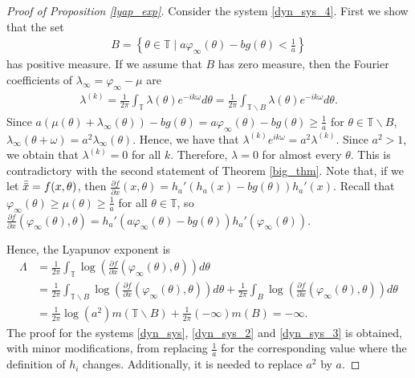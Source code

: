 \documentclass[12pt]{article}
\newcommand{\T}{\mathbb{T}}
\theoremstyle{plain}
\theoremstyle{remark}
\theoremstyle{definition}
\begin{document}
\begin{proof}[Proof of Proposition \ref{lyap_exp}]
    Consider the system \eqref{dyn_sys_4}. First we show that the set
    \begin{align*}
        B = \left\{\theta\in\T\mid a\varphi_\infty(\theta)-b g(\theta)<\frac{1}{a}\right\}
    \end{align*}
    has positive measure. If we assume that $B$ has zero measure, then the Fourier coefficients of $\lambda_\infty=\varphi_\infty-\mu$ are
    \begin{align*}
        \lambda^{(k)} = \frac{1}{2\pi}\int_\T \lambda(\theta)e^{-ik\omega}d\theta = \frac{1}{2\pi}\int_{\T\smallsetminus B} \lambda(\theta)e^{-ik\omega}d\theta.
    \end{align*}
    Since $a(\mu(\theta)+\lambda_\infty(\theta))-b g(\theta)=a\varphi_\infty(\theta)-b g(\theta)\geq\frac{1}{a}$ for $\theta\in\T\smallsetminus B$, $\lambda_\infty(\theta+\omega)=a^2\lambda_\infty(\theta)$. Hence, we have that $\lambda^{(k)}e^{ik\omega} = a^2\lambda^{(k)}$. Since $a^2>1$, we obtain that $\lambda^{(k)}=0$ for all $k$. Therefore, $\lambda=0$ for almost every $\theta$. This is contradictory with the second statement of Theorem \ref{big_thm}. Note that, if we let $\Bar{\Bar{x}}=f(x,\theta)$, then $\frac{\partial f}{\partial x}(x,\theta) = h_a'(h_a(x)-b g(\theta))h_{a}'(x)$. Recall that $\varphi_\infty(\theta)\geq\mu(\theta)\geq\frac{1}{a}$ for all $\theta\in\T$, so $\frac{\partial f}{\partial x}(\varphi_\infty(\theta),\theta) = h_a'(a\varphi_\infty(\theta)-b g(\theta))h_{a}'(\varphi_\infty(\theta))$.

    Hence, the Lyapunov exponent is
    \begin{align*}
        \Lambda &= \frac{1}{2\pi}\int_\T\log\left(\frac{\partial f}{\partial x}(\varphi_\infty(\theta),\theta)\right)d\theta\\
        &= \frac{1}{2\pi}\int_{\T\smallsetminus B}\log\left(\frac{\partial f}{\partial x}(\varphi_\infty(\theta),\theta)\right)d\theta + \frac{1}{2\pi}\int_B\log\left(\frac{\partial f}{\partial x}(\varphi_\infty(\theta),\theta)\right)d\theta\\
        &= \frac{1}{2\pi}\log(a^2)m(\T\smallsetminus B) + \frac{1}{2\pi}(-\infty)m(B) = -\infty.
    \end{align*}
    The proof for the systems \eqref{dyn_sys}, \eqref{dyn_sys_2} and \eqref{dyn_sys_3} is obtained, with minor modifications, from replacing $\frac{1}{a}$ for the corresponding value where the definition of $h_i$ changes. Additionally, it is needed to replace $a^2$ by $a$.
\end{proof}
\end{document}
